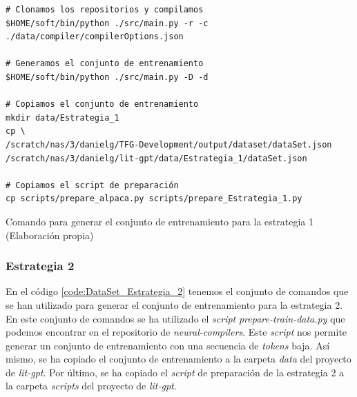 \begin{mycode}
    \begin{verbatim}
# Clonamos los repositorios y compilamos
$HOME/soft/bin/python ./src/main.py -r -c ./data/compiler/compilerOptions.json

# Generamos el conjunto de entrenamiento
$HOME/soft/bin/python ./src/main.py -D -d

# Copiamos el conjunto de entrenamiento
mkdir data/Estrategia_1
cp \
/scratch/nas/3/danielg/TFG-Development/output/dataset/dataSet.json 
/scratch/nas/3/danielg/lit-gpt/data/Estrategia_1/dataSet.json

# Copiamos el script de preparación
cp scripts/prepare_alpaca.py scripts/prepare_Estrategia_1.py
    \end{verbatim}
    \caption[Comando para generar el conjunto de entrenamiento para la estrategia 1]{Comando para generar el conjunto de entrenamiento para la estrategia 1 (Elaboración propia)}
    \label{code:DataSet_Estrategia_1}
\end{mycode}

\subsubsection{Estrategia 2}
\label{subsubsec:creacion_conjunto:estrategia_2}


En el código \ref{code:DataSet_Estrategia_2} tenemos el conjunto de comandos que se han
utilizado para generar el conjunto de entrenamiento para la estrategia 2. En este conjunto
de comandos se ha utilizado el \textit{script} \textit{prepare-train-data.py} que podemos encontrar
en el repositorio de \textit{neural-compilers}. Este \textit{script} nos permite generar un conjunto
de entrenamiento con una secuencia de \textit{tokens} baja. Así mismo, se ha copiado el conjunto
de entrenamiento a la carpeta \textit{data} del proyecto de \textit{lit-gpt}. Por último,
se ha copiado el \textit{script} de preparación de la estrategia 2 a la carpeta \textit{scripts}
del proyecto de \textit{lit-gpt}.

